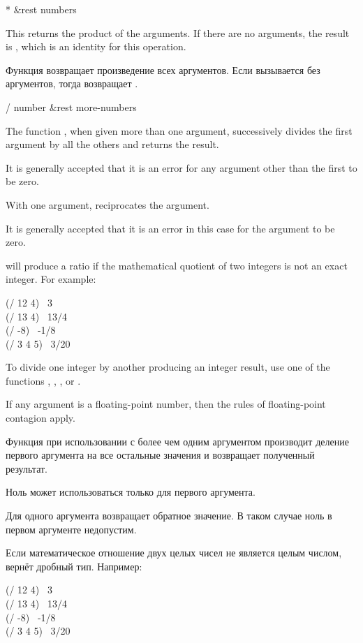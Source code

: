 \begin{defun}[Function]
* &rest numbers

This returns the product of the arguments.
If there are no arguments, the result
is , which is an identity for this operation.

Функция возвращает произведение всех аргументов.
Если вызывается без аргументов, тогда возвращает .
\end{defun}

\begin{defun}[Function]
/ number &rest more-numbers

The function \cdf{/}, when given more than one argument, successively divides
the first argument by all the others and returns the result.

\begin{new}%
It is generally accepted that it is an error for any argument other than the
first to be zero.
\end{new}

With one argument, \cdf{/} reciprocates the argument.

\begin{new}%
It is generally accepted that it is an error in this case for the argument
to be zero.
\end{new}

\cdf{/} will produce a ratio if the mathematical quotient of two integers
is not an exact integer.  For example:
\begin{lisp}
(/ 12 4) \EV\ 3 \\
(/ 13 4) \EV\ 13/4 \\
(/ -8) \EV\ -1/8 \\
(/ 3 4 5) \EV\ 3/20
\end{lisp}
To divide one integer by another producing an integer result,
use one of the functions , , ,
or .

If any argument is a floating-point number,
then the rules of floating-point contagion apply.

Функция \cdf{/} при использовании с более чем одним аргументом производит
деление первого аргумента на все остальные значения и возвращает полученный
результат.

Ноль может использоваться только для первого аргумента.

Для одного аргумента \cdf{/} возвращает обратное значение. В таком случае ноль в
первом аргументе недопустим.

Если математическое отношение двух целых
чисел не является целым числом, \cdf{/} вернёт дробный тип. 
Например:
\begin{lisp}
(/ 12 4) \EV\ 3 \\
(/ 13 4) \EV\ 13/4 \\
(/ -8) \EV\ -1/8 \\
(/ 3 4 5) \EV\ 3/20
\end{lisp}


\end{defun}
